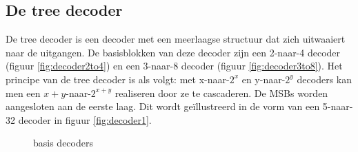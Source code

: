 \subsection{De tree decoder}
De tree decoder is een decoder met een meerlaagse structuur dat zich uitwaaiert naar de uitgangen. De basisblokken van deze decoder zijn een 2-naar-4 decoder (figuur \ref{fig:decoder2to4}) en een 3-naar-8 decoder (figuur \ref{fig:decoder3to8}). Het principe van de tree decoder is als volgt: met x-naar-$2^x$ en y-naar-$2^y$ decoders kan men een $x+y$-naar-$2^{x+y}$ realiseren door ze te cascaderen. De MSBs worden aangesloten aan de eerste laag. Dit wordt geïllustreerd in de vorm van een 5-naar-32 decoder in figuur \ref{fig:decoder1}. 
\begin{figure}[!ht]
\centering
{}
\caption{basis decoders}
\end{figure}

